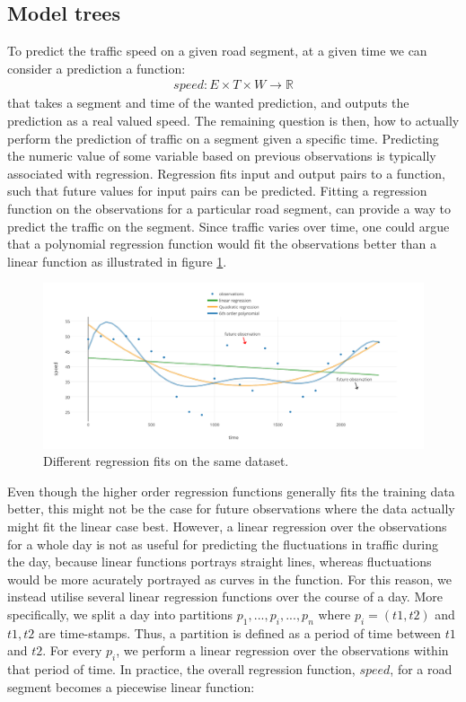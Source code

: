 \subsection{Model trees}\label{patterns:model-trees}
To predict the traffic speed on a given road segment, at a given time we can consider a prediction a function:
\begin{align*}
speed: E \times T \times W \rightarrow \mathbb{R}
\end{align*}
that takes a segment and time of the wanted prediction, and outputs the prediction as a real valued speed. The remaining question is then, how to actually perform the prediction of traffic on a segment given a specific time.
Predicting the numeric value of some variable based on previous observations is typically associated with regression. Regression fits input and output pairs to a function, such that future values for input pairs can be predicted. Fitting a regression function on the observations for a particular road segment, can provide a way to predict the traffic on the segment. Since traffic varies over time, one could argue that a polynomial regression function would fit the observations better than a linear function as illustrated in figure \ref{fig:compare-regression}.
\begin{figure}
\label{fig:compare-regression}
\includegraphics[width=\textwidth]{figures/compare-regression.pdf}
\caption{Different regression fits on the same dataset.}
\end{figure}
Even though the higher order regression functions generally fits the training data better, this might not be the case for future observations where the data actually might fit the linear case best. However, a linear regression over the observations for a whole day is not as useful for predicting the fluctuations in traffic during the day, because linear functions portrays straight lines, whereas fluctuations would be more acurately portrayed as curves in the function. For this reason, we instead utilise several linear regression functions over the course of a day. More specifically, we split a day  into partitions $p_1,...,p_i,...,p_n$ where $p_i = (t1,t2)$ and $t1,t2$ are time-stamps. Thus, a partition is defined as a period of time between $t1$ and $t2$. For every $p_i$, we perform a linear regression over the observations within that period of time. In practice, the overall regression function, $speed$, for a road segment becomes a piecewise linear function:
